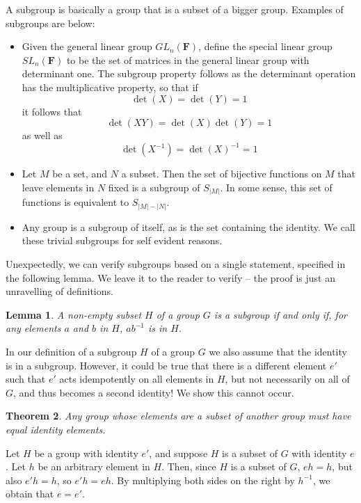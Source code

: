 \documentclass[12pt]{amsbook}
\makeatletter
\theoremstyle{plain}
\newtheorem{theorem}{Theorem}[chapter]
\newtheorem{lemma}[theorem]{Lemma}
\theoremstyle{definition}
\renewenvironment{proof}[1][\proofname]{\par
  \pushQED{\qed}%
  \normalfont \topsep6\p@\@plus6\p@\relax
  \list{}{\leftmargin=0em
          \rightmargin=\leftmargin
          \settowidth{\itemindent}{\itshape#1}%
          \labelwidth=\itemindent}

  \item[\hskip\labelsep
        \itshape
    #1\@addpunct{.}]\ignorespaces
}{%
  \popQED\endlist\@endpefalse
}
\makeatother
\begin{document}
A subgroup is basically a group that is a subset of a bigger group. Examples of subgroups are below:
\begin{itemize}
    \item Given the general linear group $GL_n(\mathbf{F})$, define the special linear group $SL_n(\mathbf{F})$  to be the set of matrices in the general linear group with determinant one. The subgroup property follows as the determinant operation has the multiplicative property, so that if
    \[ \det(X) = \det(Y) = 1 \]
    it follows that
    \[ \det(XY) = \det(X)\det(Y) = 1 \]
    as well as
    \[ \det(X^{-1}) = \det(X)^{-1} = 1 \]
    \item Let $M$ be a set, and $N$ a subset. Then the set of bijective functions on $M$ that leave elements in $N$ fixed is a subgroup of $S_{|M|}$. In some sense, this set of functions is equivalent to $S_{|M| - |N|}$.
    \item Any group is a subgroup of itself, as is the set containing the identity. We call these trivial subgroups  for self evident reasons.
\end{itemize}

Unexpectedly, we can verify subgroups based on a single statement, specified in the following lemma. We leave it to the reader to verify -- the proof is just an unravelling of definitions.

\begin{lemma}
    A non-empty subset $H$ of a group $G$ is a subgroup if and only if, for any elements $a$ and $b$ in $H$, $ab^{-1}$ is in $H$.
\end{lemma}

In our definition of a subgroup $H$ of a group $G$ we also assume that the identity is in a subgroup. However, it could be true that there is a different element $e'$ such that $e'$ acts idempotently on all elements in $H$, but not necessarily on all of $G$, and thus becomes a second identity! We show this cannot occur.

\begin{theorem}
    Any group whose elements are a subset of another group must have equal identity elements.
\end{theorem}
\begin{proof}
    Let $H$ be a group with identity $e'$, and suppose $H$ is a subset of $G$ with identity $e$. Let $h$ be an arbitrary element in $H$. Then, since $H$ is a subset of $G$, $eh = h$, but also $e'h = h$, so $e'h = eh$. By multiplying both sides on the right by $h^{-1}$, we obtain that $e = e'$.
\end{proof}
\end{document}

